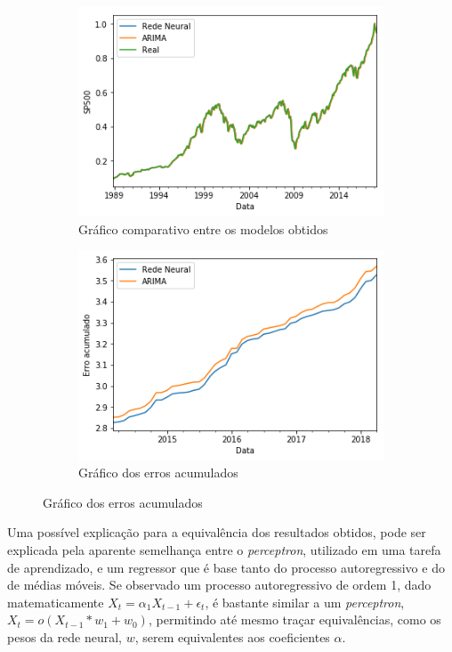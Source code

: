 \documentclass[
    12pt,
    oneside,
    a4paper,
    english,
    brazil
]{abntex2}
\begin{document}
\begin{figure}[ht]
    \caption{Comparativos dos resultados}\label{fig:comparesp500}
    \begin{subfigure}{.5\textwidth}
        \caption{Gráfico comparativo entre os modelos obtidos}\label{fig:comprealsp500}
        \includegraphics[width=.8\linewidth]{images/sp500_prediction_compare.png}
    \end{subfigure}
    \begin{subfigure}{.5\textwidth}
        \caption{Gráfico dos erros acumulados}\label{fig:cumsumsp500}
        \includegraphics[width=.8\linewidth]{images/sp500_cumsum.png}
    \end{subfigure}
\end{figure}

Uma possível  explicação para a  equivalência dos resultados obtidos,  pode ser
explicada pela  aparente semelhança  entre o \textit{perceptron},  utilizado em
uma  tarefa  de aprendizado,  e  um  regressor que  é  base  tanto do  processo
autoregressivo e do  de médias móveis. Se observado  um processo autoregressivo
de  ordem 1,  dado  matematicamente  $X_t =  \alpha_1X_{t-1}  + \epsilon_t$,  é
bastante similar  a um  \textit{perceptron}, $X_t  = o(X_{t-1}  * w_1  + w_0)$,
permitindo até mesmo  traçar equivalências, como os pesos da  rede neural, $w$,
serem equivalentes aos coeficientes $\alpha$.
\end{document}
